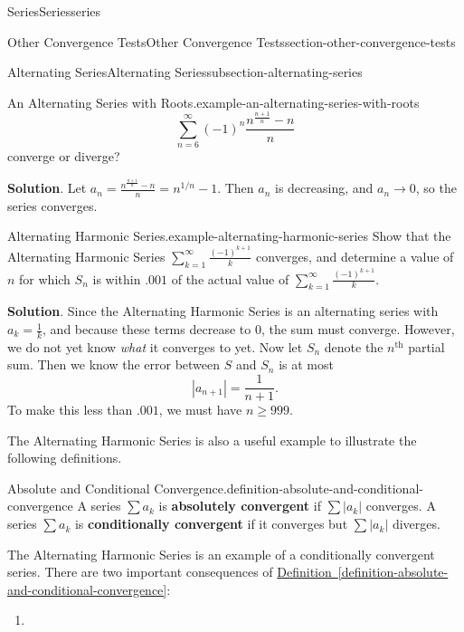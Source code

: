 \documentclass[oneside,10pt,]{book}
\newcommand{\terminology}[1]{\textbf{#1}}
\numberwithin{equation}{section}
\begin{document}
\begin{chapterptx}{Series}{}{Series}{}{}{series}
\begin{sectionptx}{Other Convergence Tests}{}{Other Convergence Tests}{}{}{section-other-convergence-tests}
\begin{subsectionptx}{Alternating Series}{}{Alternating Series}{}{}{subsection-alternating-series}
\begin{example}{An Alternating Series with Roots.}{example-an-alternating-series-with-roots}
\begin{equation*}
\sum_{n = 6}^{\infty}(-1)^{n}\frac{n^{\frac{n + 1}{n}} - n}{n}
\end{equation*}
converge or diverge?%
\par\smallskip%
\noindent\textbf{Solution}.\hypertarget{solution-185}{}\quad%
\hypertarget{p-902}{}%
Let \(a_{n} = \frac{n^{\frac{n+1}{n}} - n}{n} = n^{1/n} - 1\). Then \(a_{n}\) is decreasing, and \(a_{n}\to0\), so the series converges.%
\end{example}
\begin{example}{Alternating Harmonic Series.}{example-alternating-harmonic-series}%
\hypertarget{p-903}{}%
Show that the Alternating Harmonic Series \(\sum_{k=1}^{\infty}\frac{(-1)^{k + 1}}{k}\) converges, and determine a value of \(n\) for which \(S_{n}\) is within \(.001\) of the actual value of \(\sum_{k=1}^{\infty}\frac{(-1)^{k+1}}{k}\).%
\par\smallskip%
\noindent\textbf{Solution}.\hypertarget{solution-186}{}\quad%
\hypertarget{p-904}{}%
Since the Alternating Harmonic Series is an alternating series with \(a_{k} = \frac{1}{k}\), and because these terms decrease to \(0\), the sum must converge. However, we do not yet know \emph{what} it converges to yet. Now let \(S_{n}\) denote the \(n^{\text{th}}\) partial sum. Then we know the error between \(S\) and \(S_{n}\) is at most%
\begin{equation*}
|a_{n+1}| = \frac{1}{n + 1}\text{.}
\end{equation*}
To make this less than \(.001\), we must have \(n\geq 999\).%
\end{example}
\hypertarget{p-905}{}%
The Alternating Harmonic Series is also a useful example to illustrate the following definitions.%
\begin{definition}{Absolute and Conditional Convergence.}{definition-absolute-and-conditional-convergence}%
\hypertarget{p-906}{}%
A series \(\sum a_{k}\) is \terminology{absolutely convergent} if \(\sum |a_{k}|\) converges. A series \(\sum a_{k}\) is \terminology{conditionally convergent} if it converges but \(\sum|a_{k}|\) diverges.%
\end{definition}
\hypertarget{p-907}{}%
The Alternating Harmonic Series is an example of a conditionally convergent series. There are two important consequences of \hyperref[definition-absolute-and-conditional-convergence]{Definition~\ref{definition-absolute-and-conditional-convergence}}:\leavevmode%
\begin{enumerate}
\item\hypertarget{li-99}{}\hypertarget{p-908}{}%

\end{enumerate}
\end{subsectionptx}
\end{sectionptx}
\end{chapterptx}
\end{document}
